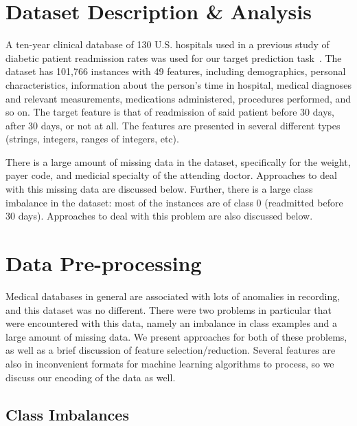 \documentclass[conference]{IEEEtran}
\begin{document}
\section{Dataset Description \& Analysis}


A ten-year clinical database of 130 U.S. hospitals used in a previous study of diabetic patient readmission rates was used for our target prediction task~\cite{dataset-2014, hba1c-2014}. The dataset has 101,766 instances with 49 features, including demographics, personal characteristics, information about the person's time in hospital, medical diagnoses and relevant measurements, medications administered, procedures performed, and so on. The target feature is that of readmission of said patient before 30 days, after 30 days, or not at all. The features are presented in several different types (strings, integers, ranges of integers, etc).

There is a large amount of missing data in the dataset, specifically for the weight, payer code, and medicial specialty of the attending doctor. Approaches to deal with this missing data are discussed below. Further, there is a large class imbalance in the dataset: most of the instances are of class 0 (readmitted before 30 days). Approaches to deal with this problem are also discussed below.

\section{Data Pre-processing}


Medical databases in general are associated with lots of anomalies in recording, and this dataset was no different. There were two problems in particular that were encountered with this data, namely an imbalance in class examples and a large amount of missing data. We present approaches for both of these problems, as well as a brief discussion of feature selection/reduction. Several features are also in inconvenient formats for machine learning algorithms to process, so we discuss our encoding of the data as well.

\subsection{Class Imbalances}
\end{document}
